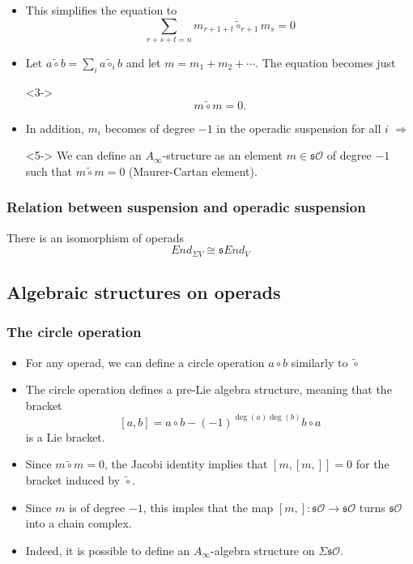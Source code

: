 \documentclass{beamer}
\theoremstyle{definition}
\begin{document}
\begin{frame}
\begin{itemize}
\item<1-> This simplifies the equation to
\[\sum_{r+s+t=n}m_{r+1+t}\tilde{\circ}_{r+1}m_s=0\] %
\item<2-> Let $a\tilde{\circ}b=\sum_{i}a\tilde{\circ}_ib$ and let $m=m_1+m_2+\cdots$. The equation becomes just
\item[]<3-> \[m\tilde{\circ}m=0.\]
\item<4-> In addition, $m_i$ becomes of degree $-1$ in the operadic suspension for all $i$ $\Rightarrow$
\item[]<5-> We can define an $A_\infty$-structure as an element $m\in\mathfrak{s}\mathcal{O}$ of degree $-1$ such that $m\tilde{\circ}m=0$ (Maurer-Cartan element). 
\end{itemize}
\end{frame}
\begin{frame}
\frametitle{Relation between suspension and operadic suspension}
\begin{theorem}[Markl]
There is an isomorphism of operads
\[End_{\Sigma V}\cong \mathfrak{s}End_V\]
\end{theorem}
\end{frame}
\subsection{Algebraic structures on operads}
\begin{frame}
\frametitle{The circle operation}
\begin{itemize}
\item<1-> For any operad, we can define a circle operation $a\circ b$ similarly to $\tilde{\circ}$ %
\item The circle operation defines a pre-Lie algebra structure, meaning that the bracket
\[[a,b]=a\circ b-(-1)^{\deg(a)\deg(b)}b\circ a\]
is a Lie bracket.
\end{itemize}
\end{frame}

\begin{frame}
\begin{itemize}
\item<1-> Since $m\tilde{\circ}m=0$, the Jacobi identity implies that $[m,[m,]]=0$ for the bracket induced by $\tilde{\circ}$.
\item<2-> Since $m$ is of degree $-1$, this imples that the map $[m,]:\mathfrak{s}\mathcal{O}\to\mathfrak{s}\mathcal{O}$ turns $\mathfrak{s}\mathcal{O}$ into a chain complex.
\item<3-> Indeed, it is possible to define an $A_\infty$-algebra structure on $\Sigma\mathfrak{s}\mathcal{O}$. %
\end{itemize}
\end{frame}
\end{document}
